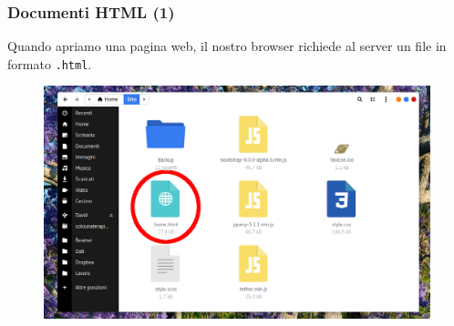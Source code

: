 \documentclass[]{beamer}
\begin{document}
\begin{frame}
\frametitle{Documenti HTML (1)}
Quando apriamo una pagina web, il nostro browser richiede al server un \alert{file in formato \texttt{.html}}.
\begin{figure}
\includegraphics[width=.8\columnwidth]{screenshots/html.png}
\end{figure}
\end{frame}
\end{document}
